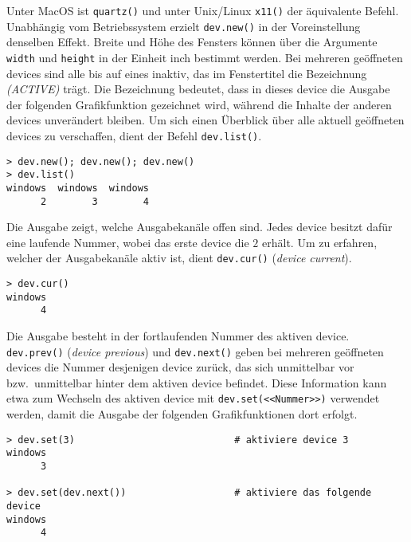 Unter MacOS ist \lstinline!quartz()! und unter Unix/Linux \lstinline!x11()! der äquivalente Befehl. Unabhängig vom Betriebssystem erzielt  \lstinline!dev.new()! in der Voreinstellung denselben Effekt. Breite und Höhe des Fensters können über die Argumente \lstinline!width! und \lstinline!height! in der Einheit inch bestimmt werden. Bei mehreren geöffneten devices sind alle bis auf eines inaktiv, das im Fenstertitel die Bezeichnung \emph{(ACTIVE)} trägt. Die Bezeichnung bedeutet, dass in dieses device die Ausgabe der folgenden Grafikfunktion gezeichnet wird, während die Inhalte der anderen devices unverändert bleiben. Um sich einen Überblick über alle aktuell geöffneten devices zu verschaffen, dient der Befehl \lstinline!dev.list()!.
\begin{lstlisting}
> dev.new(); dev.new(); dev.new()
> dev.list()
windows  windows  windows
      2        3        4
\end{lstlisting}

Die Ausgabe zeigt, welche Ausgabekanäle offen sind. Jedes device besitzt dafür eine laufende Nummer, wobei das erste device die $2$ erhält. Um zu erfahren, welcher der Ausgabekanäle aktiv ist, dient \lstinline!dev.cur()! (\emph{device current}).
\begin{lstlisting}
> dev.cur()
windows
      4
\end{lstlisting}

Die Ausgabe besteht in der fortlaufenden Nummer des aktiven device. \lstinline!dev.prev()! (\emph{device previous}) und \lstinline!dev.next()! geben bei mehreren geöffneten devices die Nummer desjenigen device zurück, das sich unmittelbar vor bzw.\ unmittelbar hinter dem aktiven device befindet. Diese Information kann etwa zum Wechseln des aktiven device mit \lstinline!dev.set(<<Nummer>>)! verwendet werden, damit die Ausgabe der folgenden Grafikfunktionen dort erfolgt.
\begin{lstlisting}
> dev.set(3)                            # aktiviere device 3
windows
      3

> dev.set(dev.next())                   # aktiviere das folgende device
windows
      4
\end{lstlisting}

